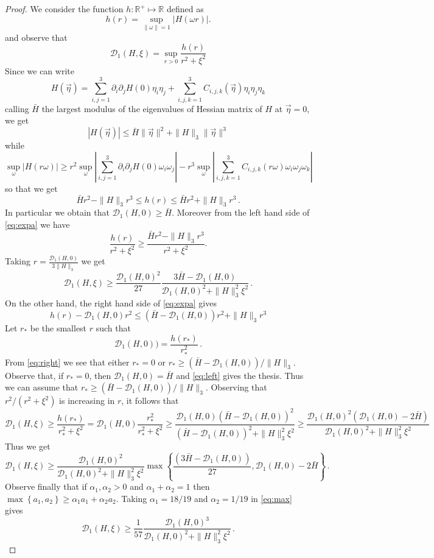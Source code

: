 \documentclass{article}
\newcommand\calD{{\mathcal D}}
\renewcommand\v[1]{\vec{#1}}
\newcommand\set[1]{\left\{ #1 \right\}}
\begin{document}
\begin{proof}
We consider the function $h:\mathds R^+\mapsto\mathds R$ defined as
\[
h(r)=\sup_{\|\omega\|=1}|H(\omega r)|.
\]
and observe that
\[
\calD_1(H,\xi)=\sup_{r>0}\frac{h(r)}{r^2+\xi^2}
\]
Since we can write
\[
H(\v\eta)=\sum_{i,j=1}^3\partial_i\partial_jH(0)\eta_i\eta_j+\sum_{i,j,k=1}^3C_{i,j,k}(\v\eta)\eta_i\eta_j\eta_k
\]
calling $\bar H$ the largest modulus of the eigenvalues of Hessian matrix of $H$ at $\v\eta=0$, we get
\[
|H(\v\eta)|\leq\bar H\|\v\eta\|^2+\|H\|_3\|\v\eta\|^3
\]
while 
\[
\sup_{\omega}|H(r\omega)|\geq r^2\sup_{\omega}\left|\sum_{i,j=1}^3\partial_i\partial_jH(0)\omega_i\omega_j\right|-
r^3\sup_{\omega}\left|\sum_{i,j,k=1}^3C_{i,j,k}(r\omega)\omega_i\omega_j\omega_k\right| 
\]
so that we get
\begin{equation}\label{eq:expa}
\bar H r^2 - \|H\|_3 r^3\leq h(r)\leq \bar H r^2+ \|H\|_3 r^3\, .
\end{equation}
In particular we obtain that $\calD_1(H,0)\geq \bar H$. Moreover from the left hand side of \eqref{eq:expa} we have
\[
\frac{h(r)}{r^2+\xi^2}\geq \frac{\bar H r^2-\|H\|_3r^3}{r^2+\xi^2}.
\]
Taking $r=\frac{\calD_1(H,0)}{3\|H\|_3}$ we get
\begin{equation}\label{eq:left}
\calD_1(H,\xi)\geq \frac{\calD_1(H,0)^2}{27}\frac{3\bar H -\calD_1(H,0)}{\calD_1(H,0)^2+\|H\|_3^2\xi^2}\, .
\end{equation}
On the other hand, the right hand side of \eqref{eq:expa} gives
\begin{equation}\label{eq:right}
h(r)-\calD_1(H,0)r^2\leq (\bar H-\calD_1(H,0)) r^2+ \|H\|_3 r^3
\end{equation}
Let $r_*$ be the smallest $r$ such that 
\[
\calD_1(H,0)) =\frac{h(r_*)}{r_*^2}\, .
\]
From \eqref{eq:right} we see that either $r_*=0$ or $r_*\geq (\bar H-\calD_1(H,0))/\|H\|_3$. Observe that, if $r_*=0$, then
$\calD_1(H,0)=\bar H$ and \eqref{eq:left} gives the thesis. Thus we can assume that $r_*\geq(\bar H-\calD_1(H,0))/\|H\|_3$.
Observing that $r^2/(r^2+\xi^2)$ is increasing in $r$, it follows that
\[
\calD_1(H,\xi)\geq \frac{h(r_*)}{r_*^2+\xi^2}= \calD_1(H,0)\frac{r_*^2}{r_*^2+\xi^2}\geq \frac{\calD_1(H,0)(\bar 
H-\calD_1(H,0))^2}{(\bar 
H-\calD_1(H,0))^2+\|H\|_3^2\xi^2}\geq \frac{\calD_1(H,0)^2(\calD_1(H,0)-2\bar H)}{\calD_1(H,0)^2+\|H\|_3^2\xi^2}
\]
Thus we get
\begin{equation}\label{eq:max}
\calD_1(H,\xi)\geq\frac{\calD_1(H,0)^2}{\calD_1(H,0)^2+\|H\|_3^2\xi^2}\max\set{\frac{(3\bar 
H-\calD_1(H,0))}{27},\calD_1(H,0)-2\bar H}\, .
\end{equation}
Observe finally that if $\alpha_1,\alpha_2>0$ and $\alpha_1+\alpha_2=1$ then $\max\set {a_1, a_2}\geq \alpha_1 
a_1+\alpha_2 a_2$. Taking $\alpha_1=18/19$ and $\alpha_2=1/19$ in \eqref{eq:max} gives
\[
\calD_1(H,\xi)\geq\frac 1{57}\frac{\calD_1(H,0)^3}{\calD_1(H,0)^2+\|H\|_3^2\xi^2}\, .
\]
\end{proof}
\end{document}
